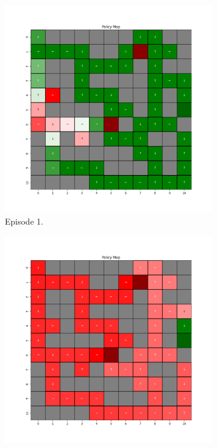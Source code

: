 \documentclass{assignment}
\begin{document}
\begin{figure}[H]
    \begin{subfigure}{0.3\textwidth}
        \includegraphics[width=\textwidth]{figures/policy_q/default/policy_alpha_0.1_gamma_0.95_epsilon_0.2_iteration_1.png}
    \caption{Episode 1.}
    \end{subfigure}\hfill
    \begin{subfigure}{0.3\textwidth}
        \includegraphics[width=\textwidth]{figures/policy_q/default/policy_alpha_0.1_gamma_0.95_epsilon_0.2_iteration_50.png}

\end{subfigure}
\end{figure}
\end{document}
